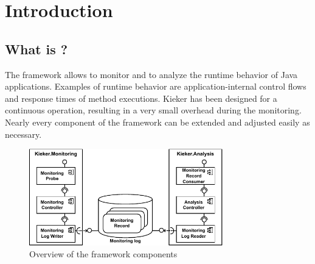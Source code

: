 \chapter{Introduction}
\section{What is \Kieker?}

The \Kieker{} framework allows to monitor and to analyze the runtime behavior %
of Java applications. Examples of runtime behavior are application-internal %
control flows and response times of method executions. %
Kieker has been designed for a continuous operation, resulting in a very small %
overhead during the monitoring. 
Nearly every component of the framework can be extended and adjusted easily as necessary.

\begin{figure}[H]\centering
\includegraphics[width=0.75\textwidth]{images/kiekerComponentDiagram-woCloud-bw-w-record-newNames}
\caption{Overview of the framework components}
\label{Figure:KiekerComponentDiagram}
\end{figure}
		
